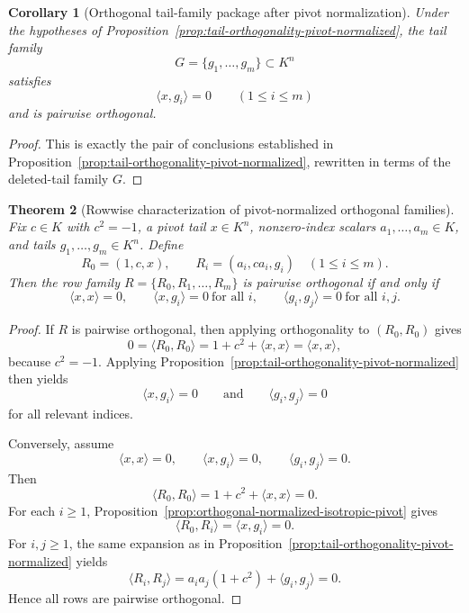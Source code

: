 \documentclass[12pt]{article}
\newtheorem{theorem}{Theorem}[section]
\newtheorem{cor}[theorem]{Corollary}
\begin{document}
\begin{cor}[Orthogonal tail-family package after pivot normalization]
\label{cor:pivot-normalized-tail-package}
Under the hypotheses of Proposition~\ref{prop:tail-orthogonality-pivot-normalized}, the tail family
\[
G=\{g_1,\dots,g_m\}\subset K^n
\]
satisfies
\[
\langle x,g_i\rangle=0 \qquad (1\le i\le m)
\]
and is pairwise orthogonal.
\end{cor}

\begin{proof}
This is exactly the pair of conclusions established in Proposition~\ref{prop:tail-orthogonality-pivot-normalized}, rewritten in terms of the deleted-tail family $G$.
\end{proof}

\begin{theorem}[Rowwise characterization of pivot-normalized orthogonal families]
\label{thm:pivot-normalized-rowwise-characterization}
Fix $c\in K$ with $c^2=-1$, a pivot tail $x\in K^n$, nonzero-index scalars $a_1,\dots,a_m\in K$, and tails $g_1,\dots,g_m\in K^n$. Define
\[
R_0=(1,c,x),
\qquad
R_i=(a_i,c a_i,g_i)\quad (1\le i\le m).
\]
Then the row family $R=\{R_0,R_1,\dots,R_m\}$ is pairwise orthogonal if and only if
\[
\langle x,x\rangle=0,
\qquad
\langle x,g_i\rangle=0 \ \text{for all } i,
\qquad
\langle g_i,g_j\rangle=0 \ \text{for all } i,j.
\]
\end{theorem}

\begin{proof}
If $R$ is pairwise orthogonal, then applying orthogonality to $(R_0,R_0)$ gives
\[
0=\langle R_0,R_0\rangle = 1+c^2+\langle x,x\rangle = \langle x,x\rangle,
\]
because $c^2=-1$. Applying Proposition~\ref{prop:tail-orthogonality-pivot-normalized} then yields
\[
\langle x,g_i\rangle=0
\qquad\text{and}\qquad
\langle g_i,g_j\rangle=0
\]
for all relevant indices.

Conversely, assume
\[
\langle x,x\rangle=0,
\qquad
\langle x,g_i\rangle=0,
\qquad
\langle g_i,g_j\rangle=0.
\]
Then
\[
\langle R_0,R_0\rangle = 1+c^2+\langle x,x\rangle = 0.
\]
For each $i\ge 1$, Proposition~\ref{prop:orthogonal-normalized-isotropic-pivot} gives
\[
\langle R_0,R_i\rangle=\langle x,g_i\rangle=0.
\]
For $i,j\ge 1$, the same expansion as in Proposition~\ref{prop:tail-orthogonality-pivot-normalized} yields
\[
\langle R_i,R_j\rangle
=
a_i a_j(1+c^2)+\langle g_i,g_j\rangle
=
0.
\]
Hence all rows are pairwise orthogonal.
\end{proof}
\end{document}
